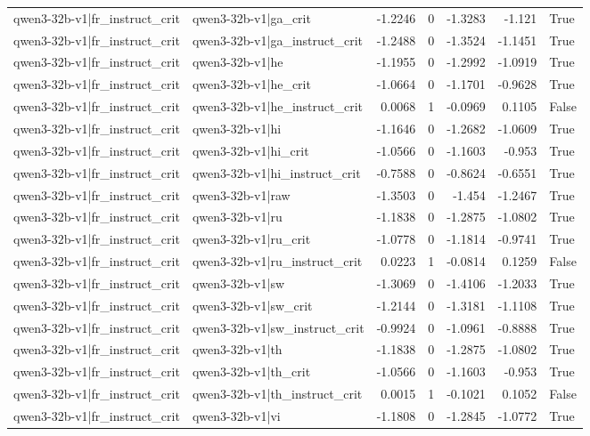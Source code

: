 \begin{table}
\begin{tabular}{l l r r r r l}
qwen3-32b-v1|fr_instruct_crit & qwen3-32b-v1|ga_crit & -1.2246 & 0 & -1.3283 & -1.121 & True \\
qwen3-32b-v1|fr_instruct_crit & qwen3-32b-v1|ga_instruct_crit & -1.2488 & 0 & -1.3524 & -1.1451 & True \\
qwen3-32b-v1|fr_instruct_crit & qwen3-32b-v1|he & -1.1955 & 0 & -1.2992 & -1.0919 & True \\
qwen3-32b-v1|fr_instruct_crit & qwen3-32b-v1|he_crit & -1.0664 & 0 & -1.1701 & -0.9628 & True \\
qwen3-32b-v1|fr_instruct_crit & qwen3-32b-v1|he_instruct_crit & 0.0068 & 1 & -0.0969 & 0.1105 & False \\
qwen3-32b-v1|fr_instruct_crit & qwen3-32b-v1|hi & -1.1646 & 0 & -1.2682 & -1.0609 & True \\
qwen3-32b-v1|fr_instruct_crit & qwen3-32b-v1|hi_crit & -1.0566 & 0 & -1.1603 & -0.953 & True \\
qwen3-32b-v1|fr_instruct_crit & qwen3-32b-v1|hi_instruct_crit & -0.7588 & 0 & -0.8624 & -0.6551 & True \\
qwen3-32b-v1|fr_instruct_crit & qwen3-32b-v1|raw & -1.3503 & 0 & -1.454 & -1.2467 & True \\
qwen3-32b-v1|fr_instruct_crit & qwen3-32b-v1|ru & -1.1838 & 0 & -1.2875 & -1.0802 & True \\
qwen3-32b-v1|fr_instruct_crit & qwen3-32b-v1|ru_crit & -1.0778 & 0 & -1.1814 & -0.9741 & True \\
qwen3-32b-v1|fr_instruct_crit & qwen3-32b-v1|ru_instruct_crit & 0.0223 & 1 & -0.0814 & 0.1259 & False \\
qwen3-32b-v1|fr_instruct_crit & qwen3-32b-v1|sw & -1.3069 & 0 & -1.4106 & -1.2033 & True \\
qwen3-32b-v1|fr_instruct_crit & qwen3-32b-v1|sw_crit & -1.2144 & 0 & -1.3181 & -1.1108 & True \\
qwen3-32b-v1|fr_instruct_crit & qwen3-32b-v1|sw_instruct_crit & -0.9924 & 0 & -1.0961 & -0.8888 & True \\
qwen3-32b-v1|fr_instruct_crit & qwen3-32b-v1|th & -1.1838 & 0 & -1.2875 & -1.0802 & True \\
qwen3-32b-v1|fr_instruct_crit & qwen3-32b-v1|th_crit & -1.0566 & 0 & -1.1603 & -0.953 & True \\
qwen3-32b-v1|fr_instruct_crit & qwen3-32b-v1|th_instruct_crit & 0.0015 & 1 & -0.1021 & 0.1052 & False \\
qwen3-32b-v1|fr_instruct_crit & qwen3-32b-v1|vi & -1.1808 & 0 & -1.2845 & -1.0772 & True \\

\end{tabular}
\end{table}
